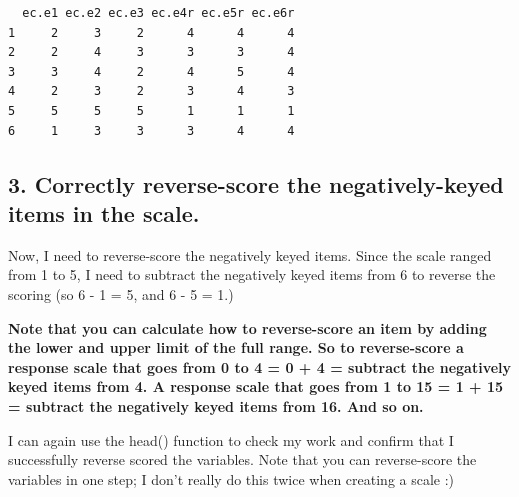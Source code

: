 \documentclass[
  letterpaper,
  DIV=11,
  numbers=noendperiod,
  oneside]{scrreprt}
\newenvironment{Shaded}{\begin{snugshade}}{\end{snugshade}}
\newcommand{\CommentTok}[1]{\textcolor[rgb]{0.37,0.37,0.37}{#1}}
\newcommand{\DecValTok}[1]{\textcolor[rgb]{0.68,0.00,0.00}{#1}}
\newcommand{\FunctionTok}[1]{\textcolor[rgb]{0.28,0.35,0.67}{#1}}
\newcommand{\NormalTok}[1]{\textcolor[rgb]{0.00,0.23,0.31}{#1}}
\newcommand{\OtherTok}[1]{\textcolor[rgb]{0.00,0.23,0.31}{#1}}
\newcommand{\SpecialCharTok}[1]{\textcolor[rgb]{0.37,0.37,0.37}{#1}}
\begin{document}
\begin{verbatim}
  ec.e1 ec.e2 ec.e3 ec.e4r ec.e5r ec.e6r
1     2     3     2      4      4      4
2     2     4     3      3      3      4
3     3     4     2      4      5      4
4     2     3     2      3      4      3
5     5     5     5      1      1      1
6     1     3     3      3      4      4
\end{verbatim}

\subsection{3. Correctly reverse-score the negatively-keyed items in the
scale.}\label{correctly-reverse-score-the-negatively-keyed-items-in-the-scale.}

Now, I need to reverse-score the negatively keyed items. Since the scale
ranged from 1 to 5, I need to subtract the negatively keyed items from 6
to reverse the scoring (so 6 - 1 = 5, and 6 - 5 = 1.)

\textbf{Note that you can calculate how to reverse-score an item by
adding the lower and upper limit of the full range. So to reverse-score
a response scale that goes from 0 to 4 = 0 + 4 = subtract the negatively
keyed items from 4. A response scale that goes from 1 to 15 = 1 + 15 =
subtract the negatively keyed items from 16. And so on.}

I can again use the head() function to check my work and confirm that I
successfully reverse scored the variables. Note that you can
reverse-score the variables in one step; I don't really do this twice
when creating a scale :)

\begin{Shaded}
\end{Shaded}
\end{document}
